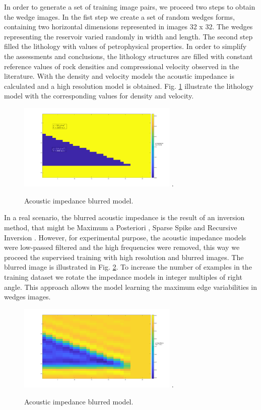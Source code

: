 \documentclass[conference,compsoc]{IEEEtran}
\begin{document}
In order to generate a set of training image pairs, we proceed two steps to obtain the wedge images.
In the fist step we create a set of random wedges forms, containing two horizontal dimensions represented in images 32 x 32.
The wedges representing the reservoir varied randomly in width and length. The second step
filled the lithology with values of petrophysical properties. In order to simplify
the assessments and conclusions, the lithology structures are filled with constant
reference values of rock densities and compressional velocity observed in the literature.
With the density and velocity models the acoustic impedance is calculated and a high
resolution model is obtained. Fig. \ref{fig_lithology} illustrate the lithology
model with the corresponding values for density and velocity.
\begin{figure}[!t]
\centering
\includegraphics[width=3.0in]{Figs/Image_Paper}
\DeclareGraphicsExtensions.
\caption{Acoustic impedance blurred model.}
\label{fig_lithology}
\end{figure}

In a real scenario, the blurred acoustic impedance is the
result of an inversion method, that might be Maximum a Posteriori \cite{}, Sparse Spike \cite{} and Recursive Inversion \cite{}.
However, for experimental purpose, the acoustic impedance models were low-passed filtered
and the high frequencies were removed, this way we proceed the supervised training with high resolution and blurred images. The blurred image 
is illustrated in Fig. \ref{fig_blur}. To increase the number of examples in the training dataset we rotate the impedance models 
in integer multiples of right angle. This approach allows the model learning the maximum edge variabilities in wedges images.
\begin{figure}[!t]
\centering
\includegraphics[width=3.0in]{Figs/Image_Paper_blurred}
\DeclareGraphicsExtensions.
\caption{Acoustic impedance blurred model.}
\label{fig_blur}
\end{figure}
\end{document}
